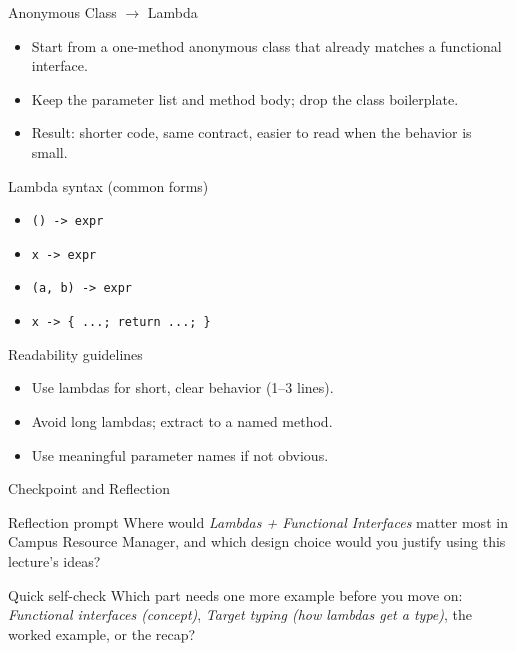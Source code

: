 \documentclass{beamer}
\begin{document}
\begin{frame}{Anonymous Class $\rightarrow$ Lambda}
  \begin{itemize}[<+->]
    \item Start from a one-method anonymous class that already matches a functional interface.
    \item Keep the parameter list and method body; drop the class boilerplate.
    \item Result: shorter code, same contract, easier to read when the behavior is small.
  \end{itemize}
  \slidesources{\OOPSUnitIVSources}
\end{frame}

\begin{frame}{Lambda syntax (common forms)}
  \begin{itemize}[<+->]
    \item \texttt{() -> expr}
    \item \texttt{x -> expr}
    \item \texttt{(a, b) -> expr}
    \item \texttt{x -> \{ ...; return ...; \}}
  \end{itemize}
  \slidesources{\OOPSUnitIVSources}
\end{frame}

\begin{frame}{Readability guidelines}
  \begin{itemize}[<+->]
    \item Use lambdas for short, clear behavior (1--3 lines).
    \item Avoid long lambdas; extract to a named method.
    \item Use meaningful parameter names if not obvious.
  \end{itemize}
  \slidesources{\OOPSUnitIVSources}
\end{frame}

\begin{frame}{Checkpoint and Reflection}
\begin{block}{Reflection prompt}
Where would \textit{Lambdas + Functional Interfaces} matter most in Campus Resource Manager, and which design choice would you justify using this lecture's ideas?
\end{block}
\begin{block}{Quick self-check}
Which part needs one more example before you move on: \textit{Functional interfaces (concept)}, \textit{Target typing (how lambdas get a type)}, the worked example, or the recap?
\end{block}
  \slidesources{\OOPSUnitIVSources}
\end{frame}
\end{document}
